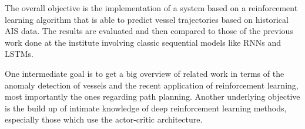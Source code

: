 The overall objective is the implementation of a system based on a reinforcement learning algorithm that is able to predict vessel trajectories based on historical AIS data. The results are evaluated and then compared to those of the previous work done at the institute involving classic sequential models like RNNs and LSTMs.
\par
One intermediate goal is to get a big overview of related work in terms of the anomaly detection of vessels and the recent application of reinforcement learning, most importantly the ones regarding path planning. Another underlying objective is the build up of intimate knowledge of deep reinforcement learning methods, especially those which use the actor-critic architecture.
\par
